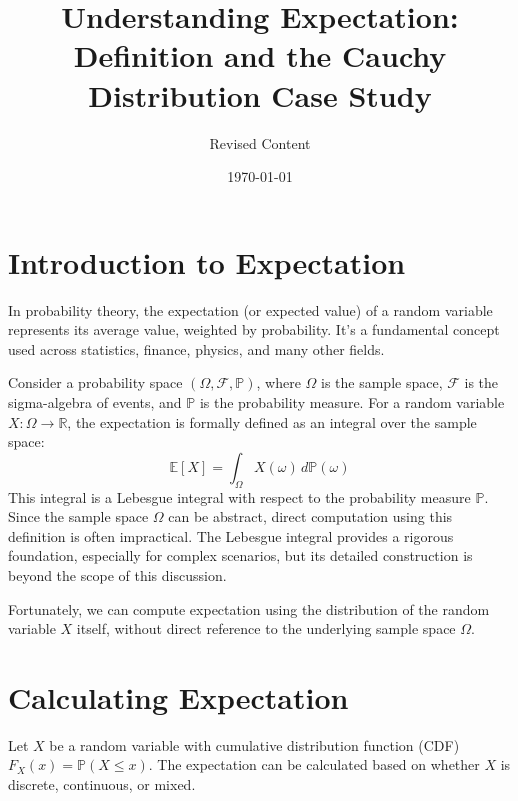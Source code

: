 \documentclass[11pt]{article}
\title{Understanding Expectation: Definition and the Cauchy Distribution Case Study}
\author{Revised Content} %
\date{\today} %
\theoremstyle{definition} %
\newcommand{\R}{\mathbb{R}}     %
\newcommand{\E}{\mathbb{E}}     %
\newcommand{\Prob}{\mathbb{P}}  %
\newcommand{\F}{\mathcal{F}}    %
\begin{document}
\maketitle

\section{Introduction to Expectation}
\label{sec:expectation_intro}

In probability theory, the expectation (or expected value) of a random variable represents its average value, weighted by probability. It's a fundamental concept used across statistics, finance, physics, and many other fields.

Consider a probability space $(\Omega, \F, \Prob)$, where $\Omega$ is the sample space, $\F$ is the sigma-algebra of events, and $\Prob$ is the probability measure. For a random variable $X: \Omega \to \R$, the expectation is formally defined as an integral over the sample space:
\[
\E[X] = \int_{\Omega} X(\omega) \, d\Prob(\omega)
\]
This integral is a Lebesgue integral with respect to the probability measure $\Prob$. Since the sample space $\Omega$ can be abstract, direct computation using this definition is often impractical. The Lebesgue integral provides a rigorous foundation, especially for complex scenarios, but its detailed construction is beyond the scope of this discussion.

Fortunately, we can compute expectation using the distribution of the random variable $X$ itself, without direct reference to the underlying sample space $\Omega$.

\section{Calculating Expectation}
\label{sec:expectation_calc}

Let $X$ be a random variable with cumulative distribution function (CDF) $F_X(x) = \Prob(X \le x)$. The expectation can be calculated based on whether $X$ is discrete, continuous, or mixed.
\end{document}

